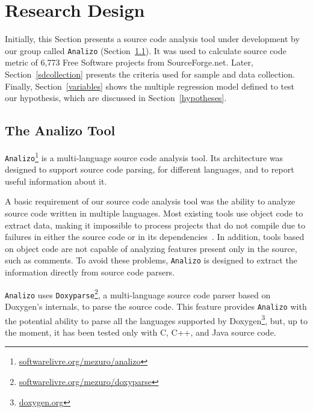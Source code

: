 \documentclass[conference]{IEEEtran}
\begin{document}
\section{Research Design} 
\label{researchDesign}

Initially, this Section presents a source code analysis tool under development by our 
group called \texttt{Analizo} (Section~\ref{analizo}). It was used 
to calculate source code metric of 6,773 Free Software projects from SourceForge.net. 
%
Later, Section~\ref{sdcollection} presents the criteria used for sample and data collection. 
%
Finally, Section~\ref{variables} shows the multiple regression model defined 
to test our hypothesis, which are discussed in Section~\ref{hypotheses}.

\subsection{The Analizo Tool}
\label{analizo}

\texttt{Analizo}\footnote{\url{softwarelivre.org/mezuro/analizo}} is a 
multi-language source code analysis tool.
%
Its architecture was designed to support source code parsing, for different
languages, and to report useful information about it.

A basic requirement of our source code analysis tool was the ability to analyze
source code written in multiple languages.
%
Most existing tools use object code to extract data, making it impossible to process
projects that do not compile due to failures in either the source code or
in its dependencies~\cite{hassan05}.
%
In addition, tools based on object code are not
capable of analyzing features present only in the source, such as comments.
%
To avoid these problems, \texttt{Analizo} is designed to extract the information
directly from source code parsers.

\texttt{Analizo} uses \texttt{Doxyparse}\footnote{\url{softwarelivre.org/mezuro/doxyparse}},
a multi-language source code parser based on Doxygen's internals, to parse the source code.
%
This feature provides \texttt{Analizo} with the potential ability to parse all 
the languages supported by Doxygen\footnote{\url{doxygen.org}}, but, 
up to the moment, it has been tested only with C, C++, and Java source code.
\end{document}
